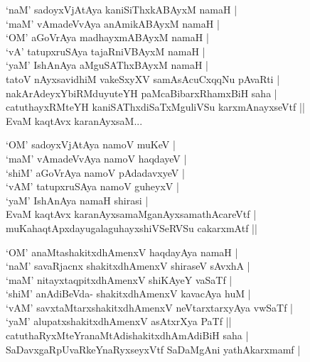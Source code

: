\begin{entry}
\begin{shl}
`naM' sadoyxVjAtAya kaniSiThxkABAyxM namaH |\\
`maM' vAmadeVvAya anAmikABAyxM namaH |\\
`OM' aGoVrAya madhayxmABAyxM namaH |\\
`vA' tatupxruSAya tajaRniVBAyxM namaH |\\
`yaM' IshAnAya aMguSAThxBAyxM namaH |\\
tatoV nAyxsavidhiM vakeSxyXV samAsAcuCxqqNu pAvaRti |\\
nakArAdeyxYbiRMduyuteYH paMcaBibarxRhamxBiH saha |\\
catuthayxRMteYH kaniSAThxdiSaTxMguliVSu karxmAnayxseVtf ||\\
EvaM kaqtAvx karanAyxsaM...
\end{shl}
\begin{shl}
`OM' sadoyxVjAtAya namoV muKeV |\\
`maM' vAmadeVvAya namoV haqdayeV |\\
`shiM' aGoVrAya namoV pAdadavxyeV |\\
`vAM' tatupxruSAya namoV guheyxV |\\
`yaM' IshAnAya namaH shirasi |\\
EvaM kaqtAvx karanAyxsamaMganAyxsamathAcareVtf |\\
muKahaqtApxdayugalaguhayxshiVSeRVSu cakarxmAtf ||
\end{shl}
\begin{shl}
`OM' anaMtashakitxdhAmenxV haqdayAya namaH |\\
`naM' savaRjacnx shakitxdhAmenxV shiraseV sAvxhA |\\
`maM' nitayxtaqpitxdhAmenxV shiKAyeY vaSaTf |\\
`shiM' anAdiBeVda- shakitxdhAmenxV kavacAya huM |\\
`vAM' savxtaMtarxshakitxdhAmenxV neVtarxtarxyAya vwSaTf |\\
`yaM' alupatxshakitxdhAmenxV asAtxrXya PaTf ||\\
catuthaRyxMteYranaMtAdishakitxdhAmAdiBiH saha |\\
SaDavxgaRpUvaRkeYnaRyxseyxVtf SaDaMgAni yathAkarxmamf |
\end{shl}
\end{entry}

